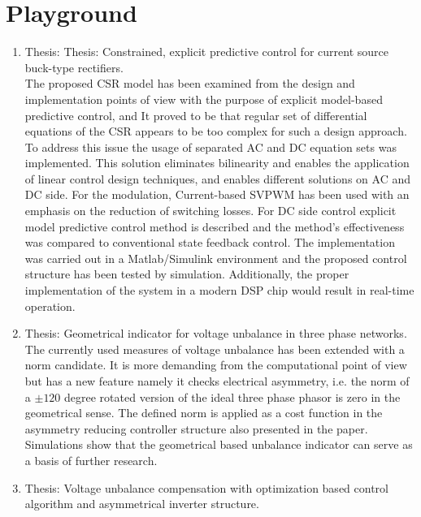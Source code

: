
\section{Playground}

\begin{enumerate}
\item Thesis: Thesis: Constrained, explicit predictive control for current source buck-type rectifiers.\\
    The proposed CSR model has been examined from the design and implementation points of view with the purpose of explicit model-based predictive control, and It proved to be that regular set of differential equations of the CSR appears to be too complex for such a design approach. To address this issue the usage of separated AC and DC equation sets was implemented. This solution eliminates bilinearity and enables the application of linear control design techniques, and enables different solutions on AC and DC side. For the modulation, Current-based SVPWM has been used with an emphasis on the reduction of switching losses. For DC side control explicit model predictive control method is described and the method's effectiveness was compared to conventional state feedback control. The implementation was carried out in a Matlab/Simulink environment and the proposed control structure has been tested by simulation. Additionally, the proper implementation of the system in a modern DSP chip would result in real-time operation.
\item Thesis: Geometrical indicator for voltage unbalance in three phase networks.\\
    The currently used measures of voltage unbalance has been extended with a norm candidate. It is more demanding from the computational point of view but has a new feature namely it checks electrical asymmetry, i.e. the norm of a $\pm120$ degree rotated version of the ideal three phase phasor is zero in the geometrical sense. The defined norm is applied as a cost function in the asymmetry reducing controller structure also presented in the paper. Simulations show that the geometrical based unbalance indicator can serve as a basis of further research.
\item Thesis: Voltage unbalance compensation with optimization based control algorithm and asymmetrical inverter structure.\\

\end{enumerate}

